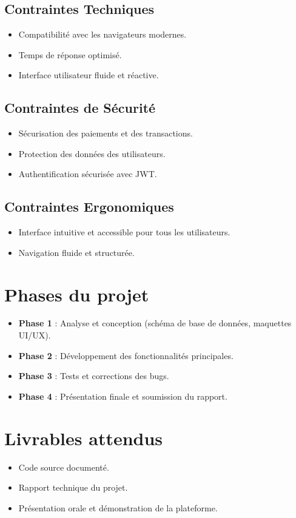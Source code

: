 \documentclass[a4paper,12pt]{article}
\begin{document}
\subsection{Contraintes Techniques}
\begin{itemize}
    \item Compatibilité avec les navigateurs modernes.
    \item Temps de réponse optimisé.
    \item Interface utilisateur fluide et réactive.
\end{itemize}

\subsection{Contraintes de Sécurité}
\begin{itemize}
    \item Sécurisation des paiements et des transactions.
    \item Protection des données des utilisateurs.
    \item Authentification sécurisée avec JWT.
\end{itemize}

\subsection{Contraintes Ergonomiques}
\begin{itemize}
    \item Interface intuitive et accessible pour tous les utilisateurs.
    \item Navigation fluide et structurée.
\end{itemize}

\section{Phases du projet}
\begin{itemize}
    \item \textbf{Phase 1} : Analyse et conception (schéma de base de données, maquettes UI/UX).
    \item \textbf{Phase 2} : Développement des fonctionnalités principales.
    \item \textbf{Phase 3} : Tests et corrections des bugs.
    \item \textbf{Phase 4} : Présentation finale et soumission du rapport.
\end{itemize}

\section{Livrables attendus}
\begin{itemize}
    \item Code source documenté.
    \item Rapport technique du projet.
    \item Présentation orale et démonstration de la plateforme.
\end{itemize}
\end{document}
